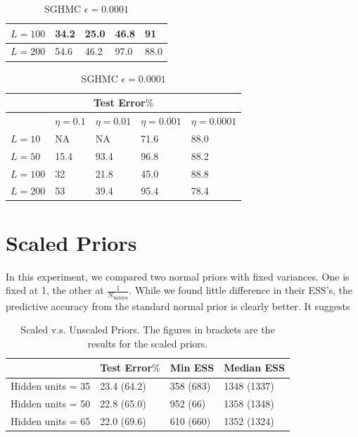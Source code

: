 \documentclass[12pt]{report}
\begin{document}
\begin{table}[]
\begin{minipage}{0.5\linewidth}
\begin{tabular}{@{}lllll@{}}
$L =100$ & 34.2      & 25.0   & 46.8      & 91   \\ \midrule
$L=200 $ & 54.6      & 46.2     & 97.0      & 88.0   \\ \bottomrule
\end{tabular}
\caption{SGHMC $\epsilon = 0.001$}
\end{minipage}
\begin{minipage}{0.5\linewidth}
\centering
\footnotesize
\begin{tabular}{@{}lllll@{}}
\toprule
\multicolumn{5}{c}{Test Error$\%$}                  \\ \midrule
     & $\eta = 0.1 $ & $\eta = 0.01$ & $\eta = 0.001$ & $\eta =0.0001$ \\ \midrule
$L=10$  & NA       & NA     & 71.6      & 88.0    \\ \midrule
$L=50$  & 15.4      & 93.4    & 96.8     & 88.2  \\ \midrule
$L =100 $& 32      & 21.8   & 45.0      & 88.8   \\ \midrule
$L=200 $ & 53      & 39.4     & 95.4      & 78.4   \\ \bottomrule
\end{tabular}
\caption{SGHMC $\epsilon = 0.0001$}
\end{minipage}
\end{table}


\section{Scaled Priors}
In this experiment, we compared two normal priors with fixed variances. One is fixed at 1, the other at $\frac{1}{N_{\text{hidden}}}$. While we found little difference in their ESS's, the predictive accuracy from the standard normal prior is clearly better. It suggests

\begin{table}[]
\centering
\begin{tabular}{@{}llll@{}}
\toprule
            & Test Error$\%$ & Min ESS & Median ESS \\ \midrule
Hidden units = 35 & 23.4 (64.2)        & 358 (683)     & 1348 (1337)       \\ \midrule
Hidden units = 50 & 22.8 (65.0)        & 952 (66)      & 1358 (1348)         \\ \midrule
Hidden units = 65 & 22.0 (69.6)      & 610 (660)      & 1352 (1324)        \\ \bottomrule
\end{tabular}
\caption{Scaled v.s. Unscaled Priors. The figures in brackets are the results for the scaled priors. }

\end{table}
\end{document}
